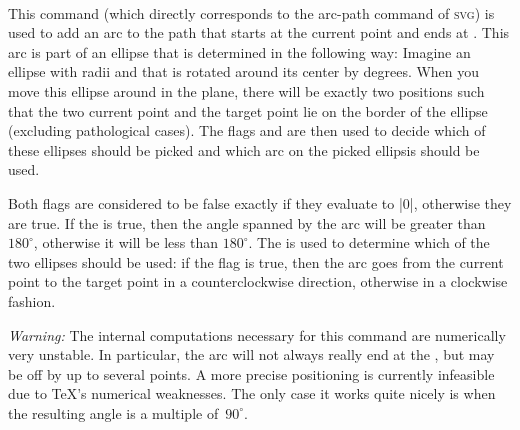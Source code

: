 \begin{command}{\pgfpatharcto{}
    \\}
  This command (which directly corresponds to the arc-path command of
  \textsc{svg}) is used to add an arc to the path that starts at the
  current point and ends at . This arc is part of
  an ellipse that is determined in the following way: Imagine an
  ellipse with radii  and  that is
  rotated around its center by  degrees. When you move
  this ellipse around in the plane, there will be exactly two
  positions such that the two current point and the target point lie
  on the border of the ellipse (excluding pathological cases). The
  flags  and  are then used to
  decide which of these ellipses should be picked and which arc on the
  picked ellipsis should be used.
\begin{codeexample}[]
\end{codeexample}
  Both flags are considered to be false exactly if they evaluate to
  |0|, otherwise they are true. If the  is true,
  then the angle spanned by the arc will be greater than $180^\circ$,
  otherwise it will be less than $180^\circ$. The  is used to determine which of the two ellipses should be
  used: if the flag is true, then the arc goes from the current point
  to the target point in a counterclockwise direction, otherwise in a
  clockwise fashion.
\begin{codeexample}[]
\end{codeexample}
  \emph{Warning:} The internal computations necessary for this command
  are numerically very unstable. In particular, the arc will not
  always really end at the , but may be off by
  up to several points. A more precise positioning is currently
  infeasible due to \TeX's numerical weaknesses. The only case it
  works quite nicely is when the resulting angle is a multiple
  of~$90^\circ$.
\end{command}

